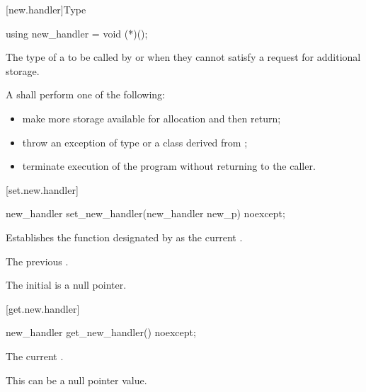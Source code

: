 [new.handler]{Type }

%
\begin{itemdecl}
using new_handler = void (*)();
\end{itemdecl}

\begin{itemdescr}
\pnum
The type of a
to be called by
or
 when they cannot satisfy a request for additional storage.

\pnum
\required
A  shall perform one of the following:
\begin{itemize}
\item
make more storage available for allocation and then return;
\item
throw an exception of type
or a class derived from
%
;
\item
terminate execution of the program without returning to the caller.
%
%
\end{itemize}
\end{itemdescr}

[set.new.handler]{}

%
\begin{itemdecl}
new_handler set_new_handler(new_handler new_p) noexcept;
\end{itemdecl}

\begin{itemdescr}
\pnum
\effects
Establishes the function designated by  as the current
.

\pnum
\returns
The previous .

\pnum
\remarks
The initial  is a null pointer.
\end{itemdescr}

[get.new.handler]{}

%
\begin{itemdecl}
new_handler get_new_handler() noexcept;
\end{itemdecl}

\begin{itemdescr}
\pnum
\returns
The current .
\begin{note}
This can be a null pointer value.
\end{note}
\end{itemdescr}

